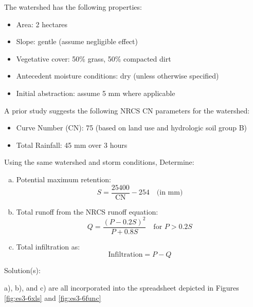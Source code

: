 \documentclass[12pt]{article}
\begin{document}
\begin{enumerate}
The watershed has the following properties:

\begin{itemize}
    \item Area: 2 hectares
    \item Slope: gentle (assume negligible effect)
    \item Vegetative cover: 50\% grass, 50\% compacted dirt
    \item Antecedent moisture conditions: dry (unless otherwise specified)
    \item Initial abstraction: assume 5 mm where applicable
\end{itemize}

A prior study suggests the following NRCS CN parameters for the watershed:
\begin{itemize}
    \item Curve Number (CN): 75 (based on land use and hydrologic soil group B)
    \item Total Rainfall: 45 mm over 3 hours
\end{itemize}

Using the same watershed and storm conditions, Determine:
\begin{enumerate}[a)]
    \item Potential maximum retention:
    \[
    S = \frac{25400}{\text{CN}} - 254 \quad \text{(in mm)}
    \]
    \item Total runoff from the NRCS runoff equation:
    \[
    Q = \frac{(P - 0.2S)^2}{P + 0.8S} \quad \text{for } P > 0.2S
    \]
    \item Total infiltration as:
    \[
    \text{Infiltration} = P - Q
    \]
\end{enumerate}

Solution(s):

a), b), and c) are all incorporated into the spreadsheet depicted in Figures \ref{fig:es3-6xls} and \ref{fig:es3-6func}


\end{enumerate}
\end{document}
